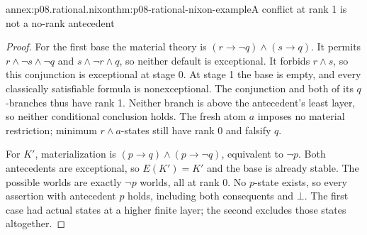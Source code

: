 \begin{annexitem}{annex:p08.rational.nixon}{thm:p08-rational-nixon-example}{A conflict at rank 1 is not a no-rank antecedent}
\begin{proof}
For the first base the material theory is
\((r\to\neg q)\wedge(s\to q)\).
It permits \(r\wedge\neg s\wedge\neg q\) and
\(s\wedge\neg r\wedge q\), so neither default is exceptional.
It forbids \(r\wedge s\), so this conjunction is exceptional
at stage 0. At stage 1 the base is empty, and every classically
satisfiable formula is nonexceptional. The conjunction and both
of its \(q\)-branches thus have rank 1. Neither branch is above
the antecedent's least layer, so neither conditional conclusion holds.
The fresh atom \(a\) imposes no material restriction; minimum
\(r\wedge a\)-states still have rank 0 and falsify \(q\).

For \(K'\), materialization is
\((p\to q)\wedge(p\to\neg q)\), equivalent to \(\neg p\).
Both antecedents are exceptional, so \(E(K')=K'\) and the base
is already stable. The possible worlds are exactly \(\neg p\)
worlds, all at rank 0. No \(p\)-state exists, so every assertion
with antecedent \(p\) holds, including both consequents and
\(\bot\). The first case had actual states at a higher finite
layer; the second excludes those states altogether.
\end{proof}
\end{annexitem}
